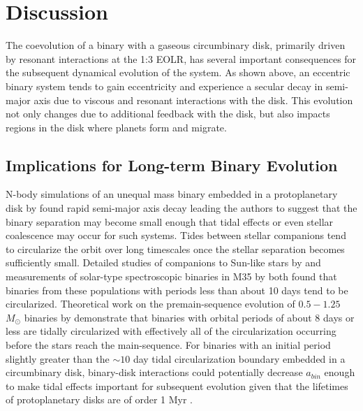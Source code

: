 
\section{Discussion} \label{sec:CBDisk_discuss}
The coevolution of a binary with a gaseous circumbinary disk, primarily driven by resonant interactions at the 1:3 EOLR, has several important consequences for the subsequent dynamical evolution of the system.  As shown above, an eccentric binary system tends to gain eccentricity and experience a secular decay in semi-major axis due to viscous and resonant interactions with the disk.  This evolution not only changes due to additional feedback with the disk, but also impacts regions in the disk where planets form and migrate.

	
\subsection{Implications for Long-term Binary Evolution} \label{CBDisk:sec:tidal_implications}

N-body simulations of an unequal mass binary embedded in a
protoplanetary disk by \citet{Artymowicz1991} found rapid semi-major axis decay leading the
authors to suggest that the binary separation may become small enough that tidal effects or even stellar coalescence may occur for such systems.  Tides 
between stellar companions tend to circularize the orbit over long timescales once the stellar separation becomes sufficiently small.  Detailed studies of 
companions to Sun-like stars by \citet{Raghavan2010} and measurements of solar-type spectroscopic binaries in M35 by \citet{Meibom2005} both found that 
binaries from these populations with periods less than about 10 days tend to be circularized.  Theoretical work on the premain-sequence evolution of 
$0.5-1.25$ $M_{\odot}$ binaries by \citet{Zahn1989} demonstrate that binaries with orbital periods of about 8 days or less are tidally circularized with effectively all 
of the circularization occurring before the stars reach the main-sequence.  For binaries with an initial period slightly greater than the $\sim 10$ day tidal 
circularization boundary embedded in a circumbinary disk, binary-disk interactions could potentially decrease $a_{bin}$ enough to make tidal effects important 
for subsequent evolution given that the lifetimes of protoplanetary disks are of order 1 Myr \citep{Haisch2001}.

